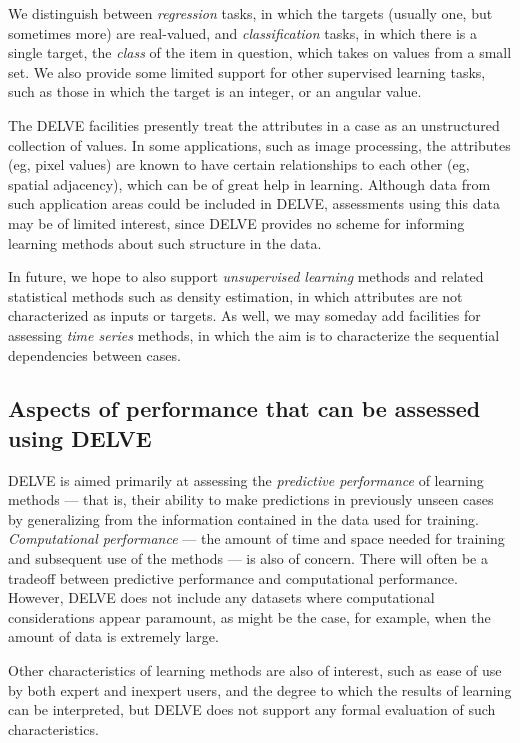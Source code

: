 We distinguish between \emph{regression} tasks, in which the targets
(usually one, but sometimes more) are real-valued, and
\emph{classification} tasks, in which there is a single target, the
\emph{class} of the item in question, which takes on values from a
small set.  We also provide some limited support for other supervised
learning tasks, such as those in which the target is an integer, or an
angular value.

The DELVE facilities presently treat the attributes in a case as an
unstructured collection of values.  In some applications, such as
image processing, the attributes (eg, pixel values) are known to have
certain relationships to each other (eg, spatial adjacency), which can
be of great help in learning.  Although data from such application
areas could be included in DELVE, assessments using this data may be
of limited interest, since DELVE provides no scheme for informing
learning methods about such structure in the data.

In future, we hope to also support \emph{unsupervised learning}
methods and related statistical methods such as density estimation, in
which attributes are not characterized as inputs or targets.  As well,
we may someday add facilities for assessing \emph{time series}
methods, in which the aim is to characterize the sequential
dependencies between cases.


\subsection{Aspects of performance that can be assessed using 
            DELVE}\label{scope-aspects}

DELVE is aimed primarily at assessing the \emph{predictive
performance} of learning methods --- that is, their ability to make
predictions in previously unseen cases by generalizing from the
information contained in the data used for training.
\emph{Computational performance} --- the amount of time and
space needed for training and subsequent use of the methods --- is
also of concern.  There will often be a tradeoff between predictive
performance and computational performance.  However, DELVE does not
include any datasets where computational considerations appear
paramount, as might be the case, for example, when the amount of data
is extremely large.

Other characteristics of learning methods are also of interest,
such as ease of use by both expert and inexpert users, and the degree
to which the results of learning can be interpreted, but DELVE does
not support any formal evaluation of such characteristics.


